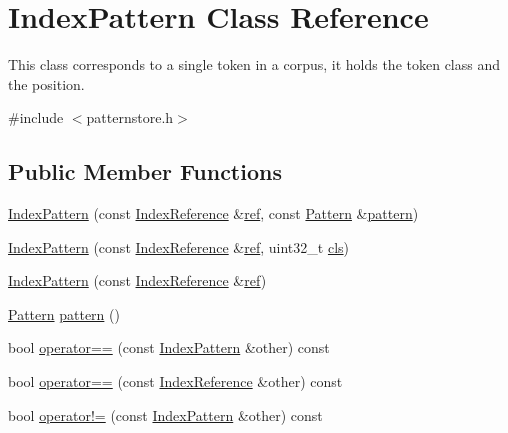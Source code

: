 \hypertarget{classIndexPattern}{}\section{Index\+Pattern Class Reference}
\label{classIndexPattern}


This class corresponds to a single token in a corpus, it holds the token class and the position.  




{\ttfamily \#include $<$patternstore.\+h$>$}

\subsection*{Public Member Functions}
\begin{DoxyCompactItemize}
\item 
\hyperlink{classIndexPattern_afd5aa833be918a676a1365b088df03ec}{Index\+Pattern} (const \hyperlink{classIndexReference}{Index\+Reference} \&\hyperlink{classIndexPattern_a068a44839584d00943b1fe06a5166dc9}{ref}, const \hyperlink{classPattern}{Pattern} \&\hyperlink{classIndexPattern_abf106928d12b0b3d6f3d8b69bec5ac91}{pattern})
\item 
\hyperlink{classIndexPattern_a56904dd604599f3ea9cc1283d0f33f6a}{Index\+Pattern} (const \hyperlink{classIndexReference}{Index\+Reference} \&\hyperlink{classIndexPattern_a068a44839584d00943b1fe06a5166dc9}{ref}, uint32\+\_\+t \hyperlink{classIndexPattern_afedfcca7851b65e8abca346df1d57e84}{cls})
\item 
\hyperlink{classIndexPattern_af8c43f63fd6648fecfda4e47fb7cab90}{Index\+Pattern} (const \hyperlink{classIndexReference}{Index\+Reference} \&\hyperlink{classIndexPattern_a068a44839584d00943b1fe06a5166dc9}{ref})
\item 
\hyperlink{classPattern}{Pattern} \hyperlink{classIndexPattern_abf106928d12b0b3d6f3d8b69bec5ac91}{pattern} ()
\item 
bool \hyperlink{classIndexPattern_ad8c623993903b92daf8a2ee965b2df3d}{operator==} (const \hyperlink{classIndexPattern}{Index\+Pattern} \&other) const 
\item 
bool \hyperlink{classIndexPattern_ac2b547d3d22e0bba569506d7d923ee5c}{operator==} (const \hyperlink{classIndexReference}{Index\+Reference} \&other) const 
\item 
bool \hyperlink{classIndexPattern_afab88a6d4bd35d07964698f0f00cb8b1}{operator!=} (const \hyperlink{classIndexPattern}{Index\+Pattern} \&other) const 
\item 

\end{DoxyCompactItemize}
